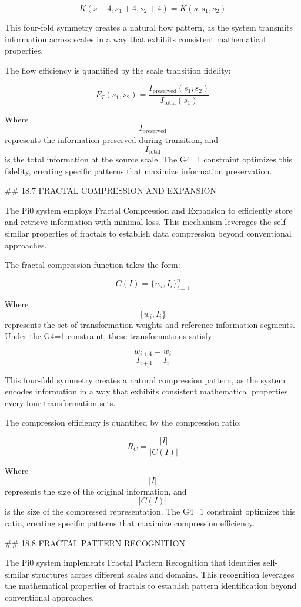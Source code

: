 $$ K(s+4, s_1+4, s_2+4) = K(s, s_1, s_2) $$

This four-fold symmetry creates a natural flow pattern, as the system transmits information across scales in a way that exhibits consistent mathematical properties.

The flow efficiency is quantified by the scale transition fidelity:

$$ F_T(s_1, s_2) = \frac{I_{\text{preserved}}(s_1, s_2)}{I_{\text{total}}(s_1)} $$

Where $$ I_{\text{preserved}} $$ represents the information preserved during transition, and $$ I_{\text{total}} $$ is the total information at the source scale. The G4=1 constraint optimizes this fidelity, creating specific patterns that maximize information preservation.

## 18.7 FRACTAL COMPRESSION AND EXPANSION

The Pi0 system employs Fractal Compression and Expansion to efficiently store and retrieve information with minimal loss. This mechanism leverages the self-similar properties of fractals to establish data compression beyond conventional approaches.

The fractal compression function takes the form:

$$ C(I) = \{w_i, I_i\}_{i=1}^n $$

Where $$ \{w_i, I_i\} $$ represents the set of transformation weights and reference information segments. Under the G4=1 constraint, these transformations satisfy:

$$ w_{i+4} = w_i $$
$$ I_{i+4} = I_i $$

This four-fold symmetry creates a natural compression pattern, as the system encodes information in a way that exhibits consistent mathematical properties every four transformation sets.

The compression efficiency is quantified by the compression ratio:

$$ R_C = \frac{|I|}{|C(I)|} $$

Where $$ |I| $$ represents the size of the original information, and $$ |C(I)| $$ is the size of the compressed representation. The G4=1 constraint optimizes this ratio, creating specific patterns that maximize compression efficiency.

## 18.8 FRACTAL PATTERN RECOGNITION

The Pi0 system implements Fractal Pattern Recognition that identifies self-similar structures across different scales and domains. This recognition leverages the mathematical properties of fractals to establish pattern identification beyond conventional approaches.

